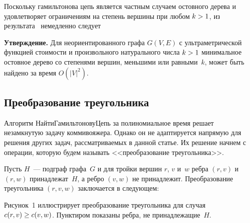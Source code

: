 \begin{multicols}{2}

Поскольку гамильтонова цепь является частным случаем остовного дерева
и удовлетворяет ограничениям на степень вершины при любом $k\hm>1$, из
результата~\cite{Gusfield} немедленно следует

\smallskip

\noindent
\textbf{Утверждение.}
Для неориентированного графа $G(V,E)$ с ультраметрической функцией стоимости и
произвольного натурального числа $k\hm>1$ минимальное остовное дерево со степенями вершин,
меньшими или равными~$k$, может быть найдено за время $O(|V|^2)$.

\subsection{Преобразование треугольника}
Алгоритм {\sf НайтиГамильтоновуЦепь} за полиномиальное время решает незамкнутую задачу коммивояжера.
Однако он не адаптируется напрямую для решения других задач, рассматриваемых в данной статье.
Их решение начнем с операции, которую будем называть <<преобразование треугольника>>.

Пусть $H$~--- подграф графа~$G$ и для тройки вершин $r$, $v$ и~$w$ ребра $(r,v)$ и $(r,w)$ принадлежат~$H$,
а ребро $(v,w)$ не принадлежит. Преобразование треугольника $(r,v,w)$ заключается в следующем:

\medskip

{\centering
{}
}


Рисунок~1 иллюстрирует преобразование треугольника для случая $c(r,v) \hm\geq c(v,w)$.
Пунктиром показаны ребра, не принадлежащие~$H$.


\end{multicols}
